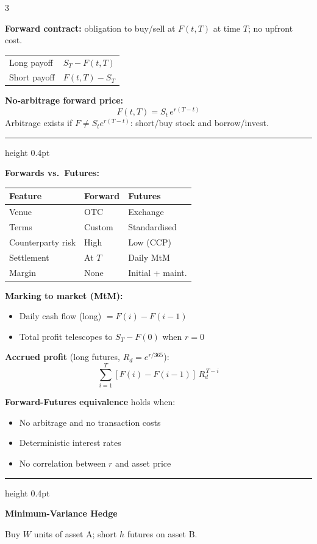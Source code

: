 \documentclass[9pt, a4paper, landscape]{extarticle}
\newcommand{\boxrule}{\vspace{3pt}\textcolor{ruleclr}{\hrule height 0.4pt}\vspace{3pt}}
\begin{document}
\begin{multicols}{3}
{\textbf{Forward contract:} obligation to buy/sell at $F(t,T)$ at time $T$; no upfront cost.

\begin{tabular}{@{}ll@{}}
  Long payoff  & $S_T - F(t,T)$ \\[2pt]
  Short payoff & $F(t,T) - S_T$ \\
\end{tabular}

\smallskip
\textbf{No-arbitrage forward price:}
\[\boxed{F(t,T)=S_t\,e^{r(T-t)}}\]
Arbitrage exists if $F\ne S_t e^{r(T-t)}$: short/buy stock and borrow/invest.

\boxrule

\textbf{Forwards vs.\ Futures:}

\begin{tabular}{@{}lll@{}}
  \toprule
  Feature & Forward & Futures \\
  \midrule
  Venue & OTC & Exchange \\
  Terms & Custom & Standardised \\
  Counterparty risk & High & Low (CCP) \\
  Settlement & At $T$ & Daily MtM \\
  Margin & None & Initial + maint. \\
  \bottomrule
\end{tabular}

\smallskip
\textbf{Marking to market (MtM):}
\begin{itemize}
  \item Daily cash flow (long) $= F(i) - F(i-1)$
  \item Total profit telescopes to $S_T - F(0)$ when $r=0$
\end{itemize}

\textbf{Accrued profit} (long futures, $R_d=e^{r/365}$):
\[
\sum_{i=1}^T[F(i)-F(i-1)]\,R_d^{\,T-i}
\]

\textbf{Forward-Futures equivalence} holds when:
\begin{itemize}
  \item No arbitrage and no transaction costs
  \item Deterministic interest rates
  \item No correlation between $r$ and asset price
\end{itemize}

\boxrule

\textbf{Minimum-Variance Hedge}

Buy $W$ units of asset A; short $h$ futures on asset B.

}
\end{multicols}
\end{document}

